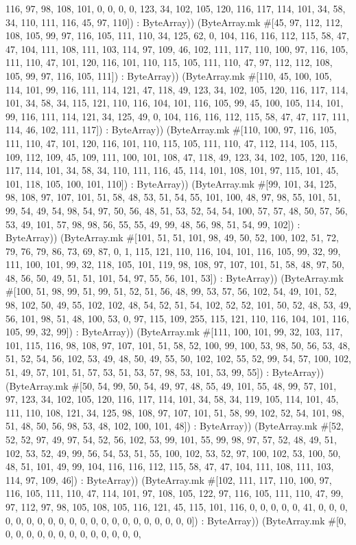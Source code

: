 \documentclass[11pt]{article}
\begin{document}
116, 97, 98, 108, 101, 0, 0, 0, 0, 123, 34, 102, 105, 120, 116, 117, 114, 101, 34, 58, 34, 110, 111, 116, 45, 97, 110]) : ByteArray)) (ByteArray.mk \#[45, 97, 112, 112, 108, 105, 99, 97, 116, 105, 111, 110, 34, 125, 62, 0, 104, 116, 116, 112, 115, 58, 47, 47, 104, 111, 108, 111, 103, 114, 97, 109, 46, 102, 111, 117, 110, 100, 97, 116, 105, 111, 110, 47, 101, 120, 116, 101, 110, 115, 105, 111, 110, 47, 97, 112, 112, 108, 105, 99, 97, 116, 105, 111]) : ByteArray)) (ByteArray.mk \#[110, 45, 100, 105, 114, 101, 99, 116, 111, 114, 121, 47, 118, 49, 123, 34, 102, 105, 120, 116, 117, 114, 101, 34, 58, 34, 115, 121, 110, 116, 104, 101, 116, 105, 99, 45, 100, 105, 114, 101, 99, 116, 111, 114, 121, 34, 125, 49, 0, 104, 116, 116, 112, 115, 58, 47, 47, 117, 111, 114, 46, 102, 111, 117]) : ByteArray)) (ByteArray.mk \#[110, 100, 97, 116, 105, 111, 110, 47, 101, 120, 116, 101, 110, 115, 105, 111, 110, 47, 112, 114, 105, 115, 109, 112, 109, 45, 109, 111, 100, 101, 108, 47, 118, 49, 123, 34, 102, 105, 120, 116, 117, 114, 101, 34, 58, 34, 110, 111, 116, 45, 114, 101, 108, 101, 97, 115, 101, 45, 101, 118, 105, 100, 101, 110]) : ByteArray)) (ByteArray.mk \#[99, 101, 34, 125, 98, 108, 97, 107, 101, 51, 58, 48, 53, 51, 54, 55, 101, 100, 48, 97, 98, 55, 101, 51, 99, 54, 49, 54, 98, 54, 97, 50, 56, 48, 51, 53, 52, 54, 54, 100, 57, 57, 48, 50, 57, 56, 53, 49, 101, 57, 98, 98, 56, 55, 55, 49, 99, 48, 56, 98, 51, 54, 99, 102]) : ByteArray)) (ByteArray.mk \#[101, 51, 51, 101, 98, 49, 50, 52, 100, 102, 51, 72, 79, 76, 79, 86, 73, 69, 87, 0, 1, 115, 121, 110, 116, 104, 101, 116, 105, 99, 32, 99, 111, 100, 101, 99, 32, 118, 105, 101, 119, 98, 108, 97, 107, 101, 51, 58, 48, 97, 50, 48, 56, 50, 49, 51, 51, 101, 54, 97, 55, 56, 101, 53]) : ByteArray)) (ByteArray.mk \#[100, 51, 98, 99, 51, 99, 51, 52, 51, 56, 48, 99, 53, 57, 56, 102, 54, 49, 101, 52, 98, 102, 50, 49, 55, 102, 102, 48, 54, 52, 51, 54, 102, 52, 52, 101, 50, 52, 48, 53, 49, 56, 101, 98, 51, 48, 100, 53, 0, 97, 115, 109, 255, 115, 121, 110, 116, 104, 101, 116, 105, 99, 32, 99]) : ByteArray)) (ByteArray.mk \#[111, 100, 101, 99, 32, 103, 117, 101, 115, 116, 98, 108, 97, 107, 101, 51, 58, 52, 100, 99, 100, 53, 98, 50, 56, 53, 48, 51, 52, 54, 56, 102, 53, 49, 48, 50, 49, 55, 50, 102, 102, 55, 52, 99, 54, 57, 100, 102, 51, 49, 57, 101, 51, 57, 53, 51, 53, 57, 98, 53, 101, 53, 99, 55]) : ByteArray)) (ByteArray.mk \#[50, 54, 99, 50, 54, 49, 97, 48, 55, 49, 101, 55, 48, 99, 57, 101, 97, 123, 34, 102, 105, 120, 116, 117, 114, 101, 34, 58, 34, 119, 105, 114, 101, 45, 111, 110, 108, 121, 34, 125, 98, 108, 97, 107, 101, 51, 58, 99, 102, 52, 54, 101, 98, 51, 48, 50, 56, 98, 53, 48, 102, 100, 101, 48]) : ByteArray)) (ByteArray.mk \#[52, 52, 52, 97, 49, 97, 54, 52, 56, 102, 53, 99, 101, 55, 99, 98, 97, 57, 52, 48, 49, 51, 102, 53, 52, 49, 99, 56, 54, 53, 51, 55, 100, 102, 53, 52, 97, 100, 102, 53, 100, 50, 48, 51, 101, 49, 99, 104, 116, 116, 112, 115, 58, 47, 47, 104, 111, 108, 111, 103, 114, 97, 109, 46]) : ByteArray)) (ByteArray.mk \#[102, 111, 117, 110, 100, 97, 116, 105, 111, 110, 47, 114, 101, 97, 108, 105, 122, 97, 116, 105, 111, 110, 47, 99, 97, 112, 97, 98, 105, 108, 105, 116, 121, 45, 115, 101, 116, 0, 0, 0, 0, 0, 41, 0, 0, 0, 0, 0, 0, 0, 0, 0, 0, 0, 0, 0, 0, 0, 0, 0, 0, 0, 0, 0]) : ByteArray)) (ByteArray.mk \#[0, 0, 0, 0, 0, 0, 0, 0, 0, 0, 0, 0, 0, 0, 
\end{document}
